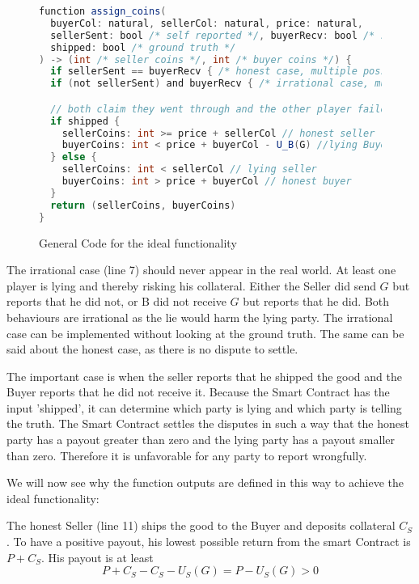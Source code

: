 \documentclass{cacthesis}
\begin{document}
\begin{figure}[htbp!]
    \centering
\begin{lstlisting}[language=java]
function assign_coins(
  buyerCol: natural, sellerCol: natural, price: natural,
  sellerSent: bool /* self reported */, buyerRecv: bool /* self reported */, 
  shipped: bool /* ground truth */
) -> (int /* seller coins */, int /* buyer coins */) {
  if sellerSent == buyerRecv { /* honest case, multiple possible solutions  */ }
  if (not sellerSent) and buyerRecv { /* irrational case, multiple possible solutions */ }

  // both claim they went through and the other player failed
  if shipped {
    sellerCoins: int >= price + sellerCol // honest seller
    buyerCoins: int < price + buyerCol - U_B(G) //lying Buyer
  } else {
    sellerCoins: int < sellerCol // lying seller
    buyerCoins: int > price + buyerCol // honest buyer
  }
  return (sellerCoins, buyerCoins)
}
\end{lstlisting}
    \caption{General Code for the ideal functionality}
\end{figure}
The irrational case (line 7) should never appear in the real world. At least one player is lying and thereby risking his collateral. Either the Seller did send $G$ but reports that he did not, or B did not receive $G$ but reports that he did. Both behaviours are irrational as the lie would harm the lying party. The irrational case can be implemented without looking at the ground truth. The same can be said about the honest case, as there is no dispute to settle.\newline

The important case is when the seller reports that he shipped the good and the Buyer reports that he did not receive it. Because the Smart Contract has the input 'shipped', it can determine which party is lying and which party is telling the truth.
The Smart Contract settles the disputes in such a way that the honest party has a payout greater than zero and the lying party has a payout smaller than zero. Therefore it is unfavorable for any party to report wrongfully.\newline

We will now see why the function outputs are defined in this way to achieve the ideal functionality:\newline

The honest Seller (line 11) ships the good to the Buyer and deposits collateral $C_S$. To have a positive payout, his lowest possible return from the smart Contract is $P + C_S$. His payout is at least
\[P + C_S - C_S - U_S(G) = P - U_S(G) > 0\]
\end{document}
